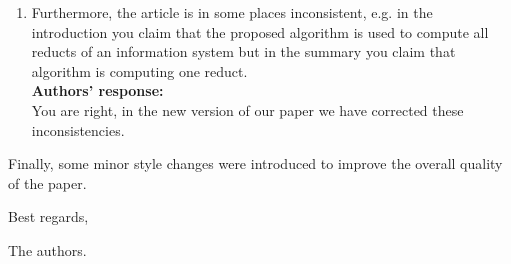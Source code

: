 \documentclass{letter}
\begin{document}
\begin{letter}{}
\begin{enumerate}
	\item Furthermore, the article is in some places inconsistent, e.g. in the introduction you  claim that the proposed algorithm is used to compute all reducts of an information system but in the summary you claim that algorithm is computing one reduct. \\
	\textbf{Authors’ response:} \\
	You are right, in the new version of our paper we have corrected these inconsistencies. 
  \end{enumerate}  
     
  
  
  Finally, some minor style changes were introduced to improve the overall quality of the paper.
  
  Best regards,

  The authors.
\end{letter}
\end{document}
